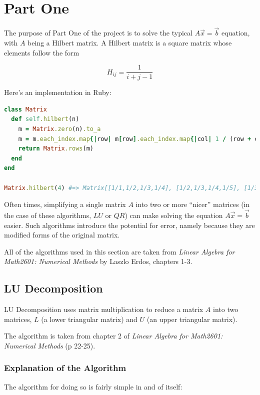 \documentclass[letterpaper,12pt]{article}
\begin{document}
\newpage
\section{Part One}


The purpose of Part One of the project is to solve the typical
$A\vec{x} = \vec{b}$ equation, with $A$ being a Hilbert matrix.
A Hilbert matrix is a square matrix whose elements follow the form

\[H_{ij} = \frac{1}{i + j - 1}\]

Here's an implementation in Ruby:

\lstset{caption=Hilbert Matrix Implementation}
\begin{lstlisting}[language=ruby]
class Matrix
  def self.hilbert(n)
    m = Matrix.zero(n).to_a
    m = m.each_index.map{|row| m[row].each_index.map{|col| 1 / (row + col + 1)}}
    return Matrix.rows(m)
  end
end

Matrix.hilbert(4) #=> Matrix[[1/1,1/2,1/3,1/4], [1/2,1/3,1/4,1/5], [1/3,1/4,1/5,1/6], [1/4,1/5,1/6,1/7]]
\end{lstlisting}

Often times, simplifying a single matrix $A$ into two or more ``nicer'' matrices
(in the case of these algorithms, $LU$ or $QR$) can make solving the equation
$A\vec{x}=\vec{b}$ easier.
Such algorithms introduce the potential for error, namely because they are
modified forms of the original matrix.

All of the algorithms used in this section are taken from \textit{Linear Algebra for Math2601: Numerical Methods}
by Laszlo Erdos, chapters 1-3.

\subsection{LU Decomposition}

LU Decomposition uses matrix multiplication to reduce a matrix $A$ into two
matrices, $L$ (a lower triangular matrix) and $U$ (an upper triangular matrix).

The algorithm is taken from chapter 2 of \textit{Linear Algebra for Math2601: Numerical Methods}
(p 22-25).

\subsubsection{Explanation of the Algorithm}

The algorithm for doing so is fairly simple in and of itself:
\end{document}
